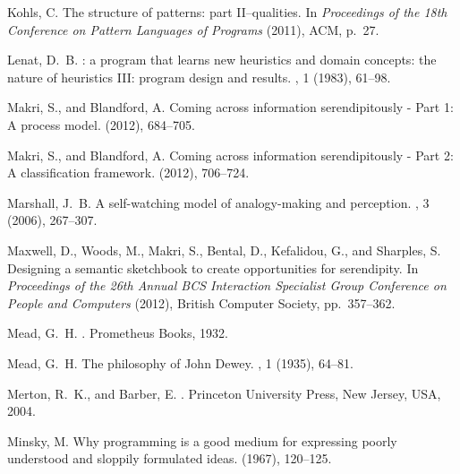 \begin{thebibliography}{10}
{\sc Kohls, C.}
\newblock The structure of patterns: part {II}--qualities.
\newblock In {\em {P}roceedings of the 18th {C}onference on {P}attern
  {L}anguages of {P}rograms\/} (2011), ACM, p.~27.

{\sc Lenat, D.~B.}
: a program that learns new heuristics and domain concepts:
  the nature of heuristics {III}: program design and results.
, 1 (1983), 61--98.

{\sc Makri, S., and Blandford, A.}
\newblock Coming across information serendipitously - {P}art 1: A process
  model.
 (2012), 684--705.

{\sc Makri, S., and Blandford, A.}
\newblock Coming across information serendipitously - {P}art 2: A
  classification framework.
 (2012), 706--724.

{\sc Marshall, J.~B.}
\newblock A self-watching model of analogy-making and perception.
, 3 (2006), 267--307.

{\sc Maxwell, D., Woods, M., Makri, S., Bental, D., Kefalidou, G., and
  Sharples, S.}
\newblock Designing a semantic sketchbook to create opportunities for
  serendipity.
\newblock In {\em Proceedings of the 26th Annual BCS Interaction Specialist
  Group Conference on People and Computers\/} (2012), British Computer Society,
  pp.~357--362.

{\sc Mead, G.~H.}
.
\newblock Prometheus Books, 1932.

{\sc Mead, G.~H.}
\newblock The philosophy of {J}ohn {D}ewey.
, 1 (1935), 64--81.

{\sc Merton, R.~K., and Barber, E.}
.
\newblock Princeton University Press, New Jersey, USA, 2004.

{\sc Minsky, M.}
\newblock Why programming is a good medium for expressing poorly understood and
  sloppily formulated ideas.
  (1967), 120--125.


\end{thebibliography}
